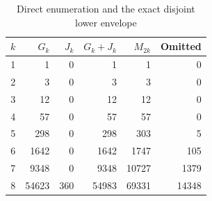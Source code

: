 \begin{table}[htbp]\centering\small
\caption{Direct enumeration and the exact disjoint lower envelope}\label{tab:exact}
\begin{tabular}{r r r r r r}\toprule
$k$ & $G_k$ & $J_k$ & $G_k+J_k$ & $M_{2k}$ & Omitted \\ \midrule
1 & 1 & 0 & 1 & 1 & 0 \\
2 & 3 & 0 & 3 & 3 & 0 \\
3 & 12 & 0 & 12 & 12 & 0 \\
4 & 57 & 0 & 57 & 57 & 0 \\
5 & 298 & 0 & 298 & 303 & 5 \\
6 & 1642 & 0 & 1642 & 1747 & 105 \\
7 & 9348 & 0 & 9348 & 10727 & 1379 \\
8 & 54623 & 360 & 54983 & 69331 & 14348 \\
\bottomrule\end{tabular}
\end{table}
